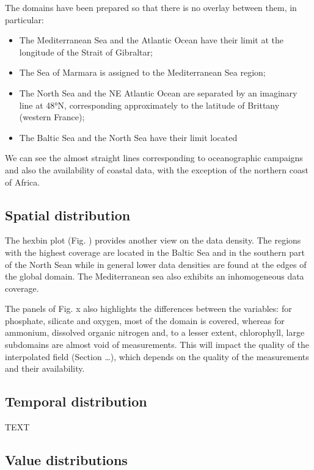 \documentclass[essd, manuscript]{copernicus}
\begin{document}
		
The domains have been prepared so that there is no overlay between them, in particular: 
\begin{itemize}
\item The Mediterranean Sea and the Atlantic Ocean have their limit at the longitude of the Strait of Gibraltar;
\item The Sea of Marmara is assigned to the Mediterranean Sea region;
\item The North Sea and the NE Atlantic Ocean are separated by an imaginary line at 48°N, corresponding approximately to the latitude of Brittany (western France);
\item The Baltic Sea and the North Sea have their limit located 
\end{itemize}
We can see the almost straight lines corresponding to oceanographic campaigns and also the availability of coastal data, with the exception of the northern coast of Africa. 

\subsection{Spatial distribution}

The hexbin plot (Fig. ) provides another view on the data density. The regions with the highest coverage are located in the Baltic Sea and in the southern part of the North Sean while in general lower data densities are found at the edges of the global domain. The Mediterranean sea also exhibits an inhomogeneous data coverage. 

The panels of Fig. x also highlights the differences between the variables: for phosphate, silicate and oxygen, most of the domain is covered, whereas for ammonium, dissolved organic nitrogen and, to a lesser extent, chlorophyll, large subdomains are almost void of measurements. This will impact the quality of the interpolated field (Section …), which depends on the quality of the measurements and their availability.











\subsection{Temporal distribution}
TEXT

\subsection{Value distributions}
\end{document}
